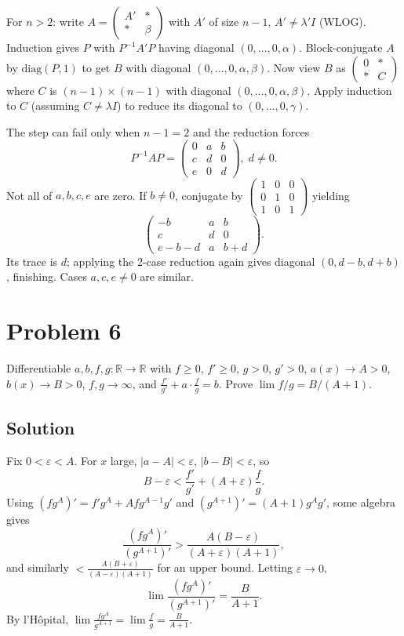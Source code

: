 \documentclass{article}
\begin{document}
For $n>2$: write $A=\begin{pmatrix}A'&*\\ *&\beta\end{pmatrix}$ with $A'$ of size $n-1$, $A'\ne\lambda' I$ (WLOG). Induction gives $P$ with $P^{-1}A'P$ having diagonal $(0,\dots,0,\alpha)$. Block-conjugate $A$ by $\mathrm{diag}(P,1)$ to get $B$ with diagonal $(0,\dots,0,\alpha,\beta)$. Now view $B$ as $\begin{pmatrix}0&*\\ *&C\end{pmatrix}$ where $C$ is $(n-1)\times(n-1)$ with diagonal $(0,\dots,0,\alpha,\beta)$. Apply induction to $C$ (assuming $C\ne\lambda I$) to reduce its diagonal to $(0,\dots,0,\gamma)$.

The step can fail only when $n-1=2$ and the reduction forces
\[P^{-1}AP = \begin{pmatrix}0&a&b\\c&d&0\\e&0&d\end{pmatrix},\; d\ne 0.\]
Not all of $a,b,c,e$ are zero. If $b\ne 0$, conjugate by $\begin{pmatrix}1&0&0\\0&1&0\\1&0&1\end{pmatrix}$ yielding
\[\begin{pmatrix}-b&a&b\\ c&d&0\\ e-b-d&a&b+d\end{pmatrix}.\]
Its trace is $d$; applying the 2-case reduction again gives diagonal $(0,d-b,d+b)$, finishing. Cases $a,c,e\ne 0$ are similar.

\section*{Problem 6}
Differentiable $a,b,f,g:\mathbb{R}\to\mathbb{R}$ with $f\ge 0$, $f'\ge 0$, $g>0$, $g'>0$, $a(x)\to A>0$, $b(x)\to B>0$, $f,g\to\infty$, and $\frac{f'}{g'}+a\cdot\frac{f}{g}=b$. Prove $\lim f/g = B/(A+1)$.

\subsection*{Solution}
Fix $0<\varepsilon<A$. For $x$ large, $|a-A|<\varepsilon$, $|b-B|<\varepsilon$, so
\[B-\varepsilon < \frac{f'}{g'}+(A+\varepsilon)\frac{f}{g}.\]
Using $(fg^A)' = f'g^A + Afg^{A-1}g'$ and $(g^{A+1})' = (A+1)g^A g'$, some algebra gives
\[\frac{(fg^A)'}{(g^{A+1})'} > \frac{A(B-\varepsilon)}{(A+\varepsilon)(A+1)},\]
and similarly $< \frac{A(B+\varepsilon)}{(A-\varepsilon)(A+1)}$ for an upper bound. Letting $\varepsilon\to 0$,
\[\lim \frac{(fg^A)'}{(g^{A+1})'} = \frac{B}{A+1}.\]
By l'Hôpital, $\lim \frac{fg^A}{g^{A+1}} = \lim \frac{f}{g} = \frac{B}{A+1}$.
\end{document}
